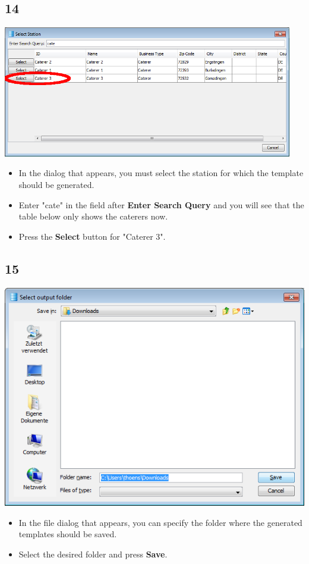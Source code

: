 \documentclass{beamer}
\begin{document}
\subsection{14}
\begin{frame}
	\begin{center}
  		\includegraphics[width=0.95\textwidth]{14.png}
	\end{center}
	\begin{itemize}
		\item In the dialog that appears, you must select the station for which the template should be generated.
		\item Enter "cate" in the field after \textbf{Enter Search Query} and you will see that the table below only shows the caterers now.
		\item Press the \textbf{Select} button for "Caterer 3".
	\end{itemize}
\end{frame}

\subsection{15}
\begin{frame}
	\begin{center}
  		\includegraphics[height=0.5\textheight]{15.png}
	\end{center}
	\begin{itemize}
		\item In the file dialog that appears, you can specify the folder where the generated templates should be saved.
		\item Select the desired folder and press \textbf{Save}.
	\end{itemize}
\end{frame}
\end{document}
